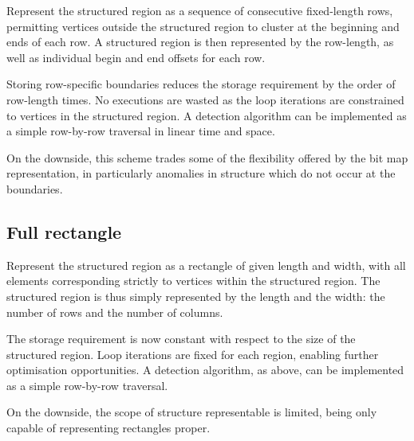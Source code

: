 Represent the structured region as a sequence of consecutive fixed-length rows, permitting vertices outside the structured region to cluster at the beginning and ends of each row. A structured region is then represented by the row-length, as well as individual begin and end offsets for each row.


Storing row-specific boundaries reduces the storage requirement by the order of row-length times.
No executions are wasted as the loop iterations are constrained to vertices in the structured region.
A detection algorithm can be implemented as a simple row-by-row traversal in linear time and space.


On the downside, this scheme trades some of the flexibility offered by the bit map representation, in particularly anomalies in structure which do not occur at the boundaries.


\subsection{Full rectangle}

Represent the structured region as a rectangle of given length and width, with all elements corresponding strictly to vertices within the structured region. The structured region is thus simply represented by the length and the width: the number of rows and the number of columns.

The storage requirement is now constant with respect to the size of the structured region.
Loop iterations are fixed for each region, enabling further optimisation opportunities.
A detection algorithm, as above, can be implemented as a simple row-by-row traversal.

On the downside, the scope of structure representable is limited, being only capable of representing rectangles proper.
